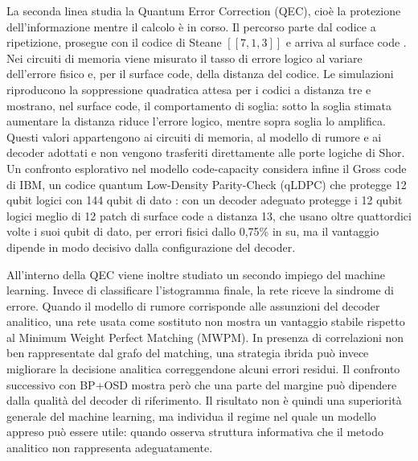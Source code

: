 La seconda linea studia la Quantum Error Correction (QEC), cioè la protezione dell'informazione mentre il calcolo è in corso. Il percorso parte dal codice a ripetizione, prosegue con il codice di Steane \ensuremath{[[7,1,3]]} e arriva al surface code \cite{steane1996,fowler2012,googleQECBelowThreshold2025,googleSurfaceCode2023}. Nei circuiti di memoria viene misurato il tasso di errore logico al variare dell'errore fisico e, per il surface code, della distanza del codice. Le simulazioni riproducono la soppressione quadratica attesa per i codici a distanza tre e mostrano, nel surface code, il comportamento di soglia: sotto la soglia stimata aumentare la distanza riduce l'errore logico, mentre sopra soglia lo amplifica. Questi valori appartengono ai circuiti di memoria, al modello di rumore e ai decoder adottati e non vengono trasferiti direttamente alle porte logiche di Shor. Un confronto esplorativo nel modello code-capacity considera infine il Gross code di IBM, un codice quantum Low-Density Parity-Check (qLDPC) che protegge 12 qubit logici con 144 qubit di dato \cite{bravyi2024}: con un decoder adeguato protegge i 12 qubit logici meglio di 12 patch di surface code a distanza 13, che usano oltre quattordici volte i suoi qubit di dato, per errori fisici dallo 0,75\% in su, ma il vantaggio dipende in modo decisivo dalla configurazione del decoder.

All'interno della QEC viene inoltre studiato un secondo impiego del machine learning. Invece di classificare l'istogramma finale, la rete riceve la sindrome di errore. Quando il modello di rumore corrisponde alle assunzioni del decoder analitico, una rete usata come sostituto non mostra un vantaggio stabile rispetto al Minimum Weight Perfect Matching (MWPM). In presenza di correlazioni non ben rappresentate dal grafo del matching, una strategia ibrida può invece migliorare la decisione analitica correggendone alcuni errori residui. Il confronto successivo con BP+OSD mostra però che una parte del margine può dipendere dalla qualità del decoder di riferimento. Il risultato non è quindi una superiorità generale del machine learning, ma individua il regime nel quale un modello appreso può essere utile: quando osserva struttura informativa che il metodo analitico non rappresenta adeguatamente.

